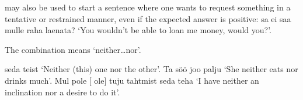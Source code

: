  may also be used to start a sentence where one wants to request something in a tentative or restrained manner, even if the expected answer is positive:  sa ei saa mulle raha laenata? `You \sing wouldn't be able to loan me money, would you?'.

\newSection \label{section-240} The combination  means `neither\dots nor'.

 seda  teist `Neither (this) one nor the other'. Ta  söö  joo palju `She neither eats nor drinks much'. Mul pole [ ole] tuju  tahtmist seda teha `I have neither an inclination nor a desire to do it'.

\Text %

\Vocabulary %

\Exercises %

\Expressions %

\AnswersToExercises %